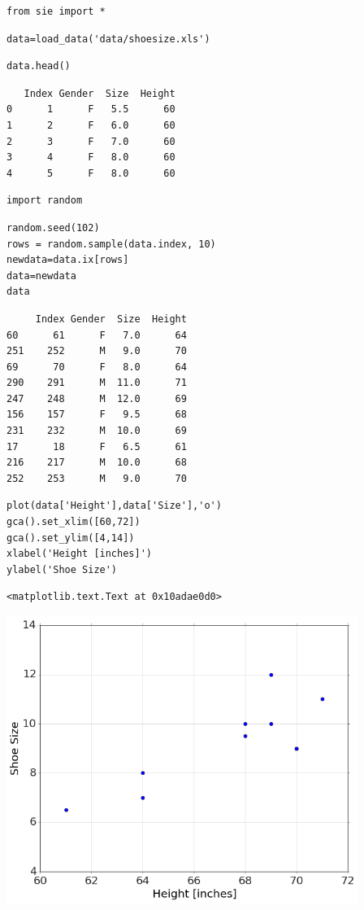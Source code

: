\begin{lstlisting}
from sie import *
\end{lstlisting}

\begin{lstlisting}
data=load_data('data/shoesize.xls')
\end{lstlisting}

\begin{lstlisting}
data.head()
\end{lstlisting}

\begin{verbatim}
   Index Gender  Size  Height
0      1      F   5.5      60
1      2      F   6.0      60
2      3      F   7.0      60
3      4      F   8.0      60
4      5      F   8.0      60
\end{verbatim}

\begin{lstlisting}
import random
\end{lstlisting}

\begin{lstlisting}
random.seed(102)
rows = random.sample(data.index, 10)
newdata=data.ix[rows]
data=newdata
data
\end{lstlisting}

\begin{verbatim}
     Index Gender  Size  Height
60      61      F   7.0      64
251    252      M   9.0      70
69      70      F   8.0      64
290    291      M  11.0      71
247    248      M  12.0      69
156    157      F   9.5      68
231    232      M  10.0      69
17      18      F   6.5      61
216    217      M  10.0      68
252    253      M   9.0      70
\end{verbatim}

\begin{lstlisting}
plot(data['Height'],data['Size'],'o')
gca().set_xlim([60,72])
gca().set_ylim([4,14])
xlabel('Height [inches]')
ylabel('Shoe Size')
\end{lstlisting}

\begin{verbatim}
<matplotlib.text.Text at 0x10adae0d0>
\end{verbatim}

\begin{center}\includegraphics[width=4.5in]{Regression/Regression_fig0.png}\end{center}

